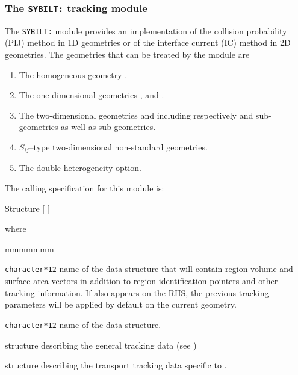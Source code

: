 \subsubsection{The {\tt SYBILT:} tracking module}\label{sect:SYBILData}

The {\tt SYBILT:} module provides an implementation of the collision probability (PIJ) method in 1D geometries or of the interface current (IC) method
in 2D geometries. The geometries that can be treated by the module  are

\begin{enumerate}

\item The homogeneous geometry .

\item The one-dimensional geometries ,  and
.\cite{ALCOL}

\item The two-dimensional geometries  and  including
respectively  and  sub-geometries as well as 
sub-geometries. 

\item $S_{ij}$--type two-dimensional non-standard geometries.\cite{Apollo}

\item The double heterogeneity option.\cite{BIHET}

\end{enumerate}

The calling specification for this module is:

\begin{DataStructure}{Structure }
\moc{:=}  $[$  $]$
 \moc{::}  
\end{DataStructure}

\noindent  where
\begin{ListeDeDescription}{mmmmmmm}

\item[\dusa{TRKNAM}] {\tt character*12} name of the  data
structure that will contain region volume and surface area vectors in
addition to region identification pointers and other tracking information.
If  also appears on the RHS, the previous tracking 
parameters will be applied by default on the current geometry.

\item[\dusa{GEONAM}] {\tt character*12} name of the  data
structure.

\item[\dstr{desctrack}] structure describing the general tracking data (see
)

\item[\dstr{descsybil}] structure describing the transport tracking data
specific to .

\end{ListeDeDescription}

